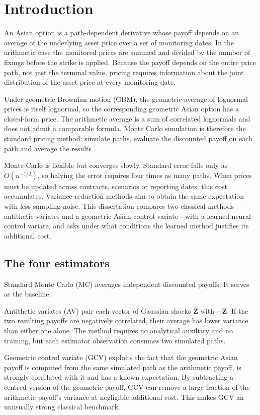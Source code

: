\chapter{Introduction}
\label{chap:introduction}

An Asian option is a path-dependent derivative whose payoff depends on an average of the underlying asset price over a set of monitoring dates. In the arithmetic case the monitored prices are summed and divided by the number of fixings before the strike is applied. Because the payoff depends on the entire price path, not just the terminal value, pricing requires information about the joint distribution of the asset price at every monitoring date.

Under geometric Brownian motion (GBM), the geometric average of lognormal prices is itself lognormal, so the corresponding geometric Asian option has a closed-form price. The arithmetic average is a sum of correlated lognormals and does not admit a comparable formula. Monte Carlo simulation is therefore the standard pricing method: simulate paths, evaluate the discounted payoff on each path and average the results \parencite{kemna_vorst_1990,glasserman_2004}.

Monte Carlo is flexible but converges slowly. Standard error falls only as $O(n^{-1/2})$, so halving the error requires four times as many paths. When prices must be updated across contracts, scenarios or reporting dates, this cost accumulates. Variance-reduction methods aim to obtain the same expectation with less sampling noise. This dissertation compares two classical methods---antithetic variates and a geometric Asian control variate---with a learned neural control variate, and asks under what conditions the learned method justifies its additional cost.

\section{The four estimators}

Standard Monte Carlo (MC) averages independent discounted payoffs. It serves as the baseline.

Antithetic variates (AV) pair each vector of Gaussian shocks $\mathbf{Z}$ with $-\mathbf{Z}$. If the two resulting payoffs are negatively correlated, their average has lower variance than either one alone. The method requires no analytical auxiliary and no training, but each estimator observation consumes two simulated paths.

Geometric control variate (GCV) exploits the fact that the geometric Asian payoff is computed from the same simulated path as the arithmetic payoff, is strongly correlated with it and has a known expectation. By subtracting a centred version of the geometric payoff, GCV can remove a large fraction of the arithmetic payoff's variance at negligible additional cost. This makes GCV an unusually strong classical benchmark.

